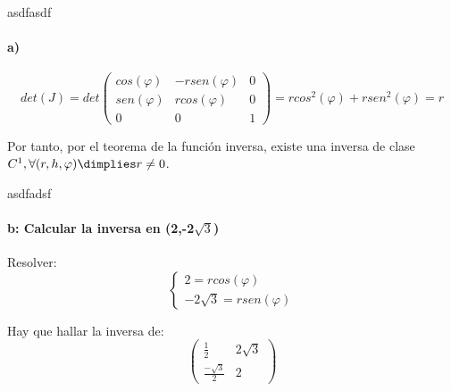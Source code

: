\begin{problem}[8]
asdfasdf
\solution

\paragraph{a)}

$$det(J) = det\begin{pmatrix}
       cos(\varphi)&-rsen(\varphi)&0\\
       sen(\varphi)&rcos(\varphi)&0\\
       0&0&1
      \end{pmatrix} = rcos^2(\varphi) + rsen^2(\varphi) = r$$
      
      Por tanto, por el teorema de la función inversa, existe una inversa de clase $C^1, \forall (r,h,\varphi) \dimplies r\neq 0$.
\end{problem}
 \begin{problem}[9]
 asdfadsf
 \solution
 \paragraph{b: Calcular la inversa en (2,-2$\sqrt{3}$)}
 
 Resolver: $$\left\{\begin{matrix} 2 = rcos(\varphi)\\-2\sqrt{3} = rsen(\varphi)\end{matrix}\right.$$
 
 Hay que hallar la inversa de: $$\begin{pmatrix}
                                  \frac{1}{2}&2\sqrt{3}\\
                                  \frac{-\sqrt{3}}{2}&2
                                 \end{pmatrix}$$

    \end{problem}                             
